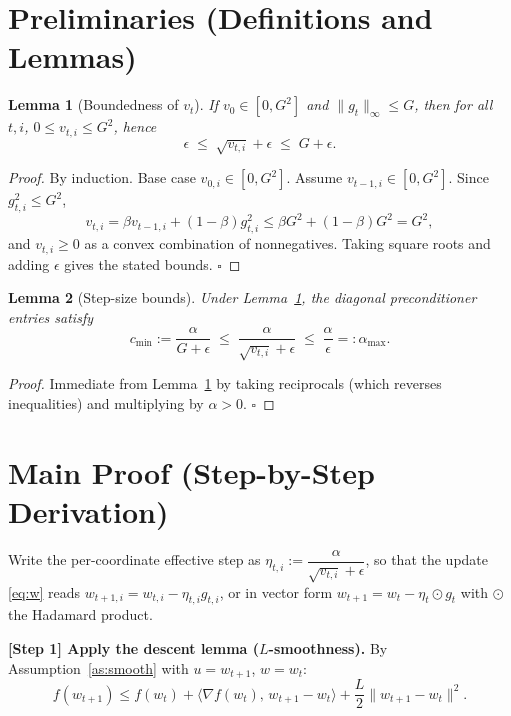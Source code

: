 \documentclass[11pt]{article}
\newtheorem{lemma}{Lemma}
\begin{document}
\section*{Preliminaries (Definitions and Lemmas)}

\begin{lemma}[Boundedness of $v_t$]\label{lem:vbound}
If $v_0\in[0,G^2]$ and $\|g_t\|_\infty\le G$, then for all $t,i$,
$0\le v_{t,i}\le G^2$, hence
\[
\epsilon \;\le\; \sqrt{v_{t,i}}+\epsilon \;\le\; G+\epsilon .
\]
\end{lemma}
\begin{proof}
By induction. Base case $v_{0,i}\in[0,G^2]$. Assume $v_{t-1,i}\in[0,G^2]$.
Since $g_{t,i}^2\le G^2$,
\[
v_{t,i} = \beta v_{t-1,i}+(1-\beta)g_{t,i}^2
\le \beta G^2 + (1-\beta)G^2 = G^2,
\]
and $v_{t,i}\ge 0$ as a convex combination of nonnegatives. Taking square
roots and adding $\epsilon$ gives the stated bounds. \hfill$\square$
\end{proof}

\begin{lemma}[Step-size bounds]\label{lem:step}
Under Lemma~\ref{lem:vbound}, the diagonal preconditioner entries satisfy
\[
c_{\min} := \frac{\alpha}{G+\epsilon}
\;\le\;
\frac{\alpha}{\sqrt{v_{t,i}}+\epsilon}
\;\le\;
\frac{\alpha}{\epsilon} =: \alpha_{\max}.
\]
\end{lemma}
\begin{proof}
Immediate from Lemma~\ref{lem:vbound} by taking reciprocals
(which reverses inequalities) and multiplying by $\alpha>0$. \hfill$\square$
\end{proof}

\section*{Main Proof (Step-by-Step Derivation)}

Write the per-coordinate effective step as
$\eta_{t,i} := \dfrac{\alpha}{\sqrt{v_{t,i}}+\epsilon}$, so that the update
\eqref{eq:w} reads $w_{t+1,i} = w_{t,i} - \eta_{t,i} g_{t,i}$, or in vector
form $w_{t+1} = w_t - \eta_t \odot g_t$ with $\odot$ the Hadamard product.

\bigskip
\noindent\textbf{[Step 1] Apply the descent lemma ($L$-smoothness).}
By Assumption~\ref{as:smooth} with $u=w_{t+1}$, $w=w_t$:
\[
f(w_{t+1}) \le f(w_t) + \langle \nabla f(w_t),\, w_{t+1}-w_t\rangle
+ \frac{L}{2}\|w_{t+1}-w_t\|^2.
\]
\end{document}
